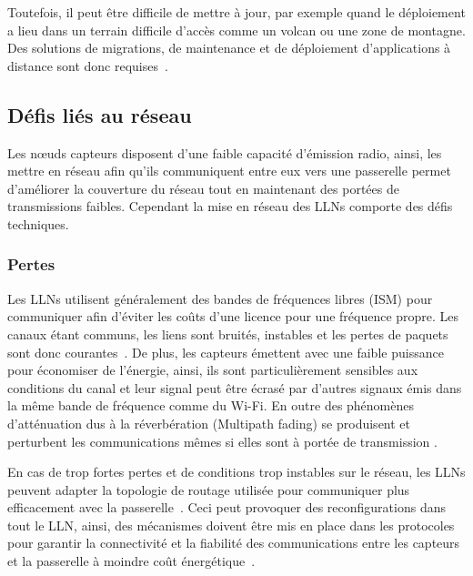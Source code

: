Toutefois, il peut être difficile de mettre à jour, par exemple quand le déploiement a lieu dans un terrain difficile d'accès comme un volcan ou une zone de montagne.
Des solutions de migrations, de maintenance et de déploiement d'applications à distance sont donc requises~\cite{brown2006updating, stathopoulos2003remote}.

\subsection{Défis liés au réseau}

Les nœuds capteurs disposent d'une faible capacité d'émission radio, ainsi, les mettre en réseau afin qu'ils communiquent entre eux vers une passerelle permet d'améliorer la couverture du réseau tout en maintenant des portées de transmissions faibles.
Cependant la mise en réseau des \ac{LLN}s comporte des défis techniques.

\subsubsection{Pertes}

Les \ac{LLN}s utilisent généralement des bandes de fréquences libres (\ac{ISM}) pour communiquer afin d'éviter les coûts d'une licence pour une fréquence propre.
Les canaux étant communs, les liens sont bruités, instables et les pertes de paquets sont donc courantes~\cite{baccour2012radio}.
De plus, les capteurs émettent avec une faible puissance pour économiser de l'énergie, ainsi, ils sont particulièrement sensibles aux conditions du canal et leur signal peut être écrasé par d'autres signaux émis dans la même bande de fréquence comme du Wi-Fi.
En outre des phénomènes d’atténuation dus à la réverbération (Multipath fading) se produisent et perturbent les communications mêmes si elles sont à portée de transmission \cite{puccinelli2006multipath}.


En cas de trop fortes pertes et de conditions trop instables sur le réseau, les \ac{LLN}s peuvent adapter la topologie de routage utilisée pour communiquer plus efficacement avec la passerelle~\cite{clausen2011critical}.
Ceci peut provoquer des reconfigurations dans tout le \ac{LLN}, ainsi, des mécanismes doivent être mis en place dans les protocoles pour garantir la connectivité et la fiabilité des communications entre les capteurs et la passerelle à moindre coût énergétique~\cite{6tisch}.

